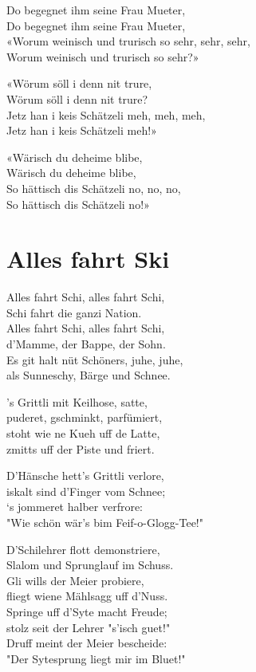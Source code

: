\documentclass[
  letterpaper,
  a5paper]{memoir}
\begin{document}
Do begegnet ihm seine Frau Mueter,\\
Do begegnet ihm seine Frau Mueter,\\
«Worum weinisch und trurisch so sehr, sehr, sehr,\\
Worum weinisch und trurisch so sehr?»

«Wörum söll i denn nit trure,\\
Wörum söll i denn nit trure?\\
Jetz han i keis Schätzeli meh, meh, meh,\\
Jetz han i keis Schätzeli meh!»

«Wärisch du deheime blibe,\\
Wärisch du deheime blibe,\\
So hättisch dis Schätzeli no, no, no,\\
So hättisch dis Schätzeli no!»

\hypertarget{alles-fahrt-ski}{%
\chapter{Alles fahrt Ski}\label{alles-fahrt-ski}}

Alles fahrt Schi, alles fahrt Schi,\\
Schi fahrt die ganzi Nation.\\
Alles fahrt Schi, alles fahrt Schi,\\
d'Mamme, der Bappe, der Sohn.\\
Es git halt nüt Schöners, juhe, juhe,\\
als Sunneschy, Bärge und Schnee.

's Grittli mit Keilhose, satte,\\
puderet, gschminkt, parfümiert,\\
stoht wie ne Kueh uff de Latte,\\
zmitts uff der Piste und friert.

D'Hänsche hett's Grittli verlore,\\
iskalt sind d'Finger vom Schnee;\\
`s jommeret halber verfrore:\\
"Wie schön wär's bim Feif-o-Glogg-Tee!"

D'Schilehrer flott demonstriere,\\
Slalom und Sprunglauf im Schuss.\\
Gli wills der Meier probiere,\\
fliegt wiene Mählsagg uff d'Nuss.\\
Springe uff d'Syte macht Freude;\\
stolz seit der Lehrer "s'isch guet!"\\
Druff meint der Meier bescheide:\\
"Der Sytesprung liegt mir im Bluet!"
\end{document}
